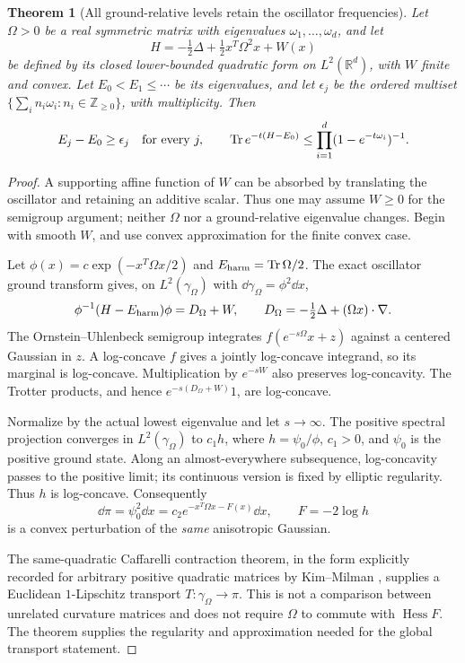 \documentclass[11pt,letterpaper]{article}
\numberwithin{equation}{section}
\newtheorem{theorem}{Theorem}[section]
\theoremstyle{definition}\newtheorem{definition}[theorem]{Definition}
\theoremstyle{remark}\newtheorem{remark}[theorem]{Remark}
\newcommand{\R}{\mathbb R}\newcommand{\Z}{\mathbb Z}
\newcommand{\Hess}{\operatorname{Hess}}
\begin{document}
\begin{theorem}[All ground-relative levels retain the oscillator frequencies]
\label{thm:spectral}
Let $\Omega>0$ be a real symmetric matrix with eigenvalues $\omega_1,\ldots,\omega_d$, and let
\[
 H=-\tfrac12\Delta+\tfrac12x^T\Omega^2x+W(x)
\]
be defined by its closed lower-bounded quadratic form on $L^2(\R^d)$, with $W$ finite and convex. Let $E_0<E_1\le\cdots$ be its eigenvalues, and let $\epsilon_j$ be the ordered multiset
$\{\sum_i n_i\omega_i:n_i\in\Z_{\ge0}\}$, with multiplicity. Then
\begin{equation}
 E_j-E_0\ge\epsilon_j\quad\text{for every }j,
 \qquad
 \operatorname{Tr} e^{-t(H-E_0)}\le\prod_{i=1}^d(1-e^{-t\omega_i})^{-1}.
 \label{eq:allspectrum}
\end{equation}
\end{theorem}
\begin{proof}
A supporting affine function of $W$ can be absorbed by translating the oscillator and retaining an additive scalar. Thus one may assume $W\ge0$ for the semigroup argument; neither $\Omega$ nor a ground-relative eigenvalue changes. Begin with smooth $W$, and use convex approximation for the finite convex case.

Let $\phi(x)=c\exp(-x^T\Omega x/2)$ and $E_{\rm harm}=\operatorname{Tr}\Omega/2$. The exact oscillator ground transform gives, on $L^2(\gamma_\Omega)$ with $\dd\gamma_\Omega=\phi^2\dd x$,
\[
 \phi^{-1}(H-E_{\rm harm})\phi
 =D_\Omega+W,\qquad D_\Omega=-\tfrac12\Delta+(\Omega x)\cdot\nabla.
\]
The Ornstein--Uhlenbeck semigroup integrates $f(e^{-s\Omega}x+z)$ against a centered Gaussian in $z$. A log-concave $f$ gives a jointly log-concave integrand, so its marginal is log-concave. Multiplication by $e^{-sW}$ also preserves log-concavity. The Trotter products, and hence $e^{-s(D_\Omega+W)}1$, are log-concave.

Normalize by the actual lowest eigenvalue and let $s\to\infty$. The positive spectral projection converges in $L^2(\gamma_\Omega)$ to $c_1h$, where $h=\psi_0/\phi$, $c_1>0$, and $\psi_0$ is the positive ground state. Along an almost-everywhere subsequence, log-concavity passes to the positive limit; its continuous version is fixed by elliptic regularity. Thus $h$ is log-concave. Consequently
\[
 \dd\pi=\psi_0^2\dd x
 =c_2 e^{-x^T\Omega x-F(x)}\dd x,\qquad F=-2\log h
\]
is a convex perturbation of the \emph{same} anisotropic Gaussian.

The same-quadratic Caffarelli contraction theorem, in the form explicitly recorded for arbitrary positive quadratic matrices by Kim--Milman \cite{KimMilman}, supplies a Euclidean $1$-Lipschitz transport $T:\gamma_\Omega\to\pi$. This is not a comparison between unrelated curvature matrices and does not require $\Omega$ to commute with $\Hess F$. The theorem supplies the regularity and approximation needed for the global transport statement.


\end{proof}
\end{document}
